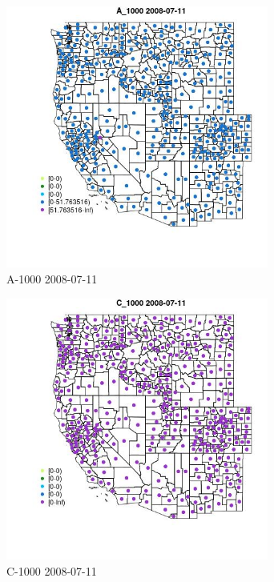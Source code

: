 \begin{figure} 
\centering  
\includegraphics[width=0.77\textwidth]{Code_Outputs/df_report_ML_predictors_CountyCentroid_Locations_Dates_2008-01-01to2018-12-31_MapObsA_10002008-07-11.jpg} 
\caption{\label{fig:df_report_ML_predictors_CountyCentroid_Locations_Dates_2008-01-01to2018-12-31MapObsA_10002008-07-11}A-1000 2008-07-11} 
\end{figure} 
 

\clearpage 

\begin{figure} 
\centering  
\includegraphics[width=0.77\textwidth]{Code_Outputs/df_report_ML_predictors_CountyCentroid_Locations_Dates_2008-01-01to2018-12-31_MapObsC_10002008-07-11.jpg} 
\caption{\label{fig:df_report_ML_predictors_CountyCentroid_Locations_Dates_2008-01-01to2018-12-31MapObsC_10002008-07-11}C-1000 2008-07-11} 
\end{figure} 
 

